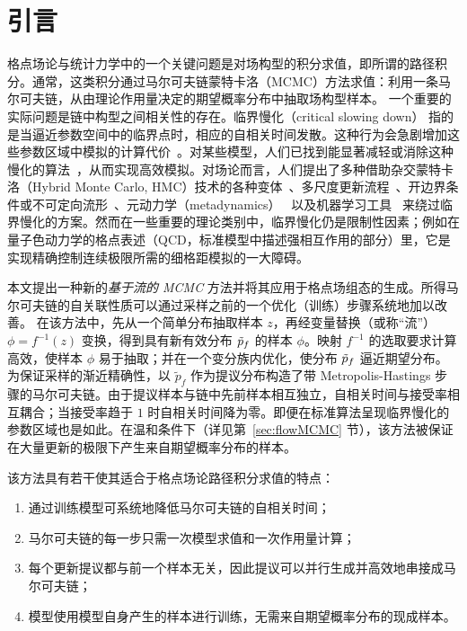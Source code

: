\section{引言}
\label{sec:intro}

%
格点场论与统计力学中的一个关键问题是对场构型的积分求值，即所谓的路径积分。通常，这类积分通过马尔可夫链蒙特卡洛（MCMC）方法求值：利用一条马尔可夫链，从由理论作用量决定的期望概率分布中抽取场构型样本。
%
一个重要的实际问题是链中构型之间相关性的存在。临界慢化（critical slowing down）\cite{Wolff:1989wq} 指的是当逼近参数空间中的临界点时，相应的自相关时间发散。这种行为会急剧增加这些参数区域中模拟的计算代价~\cite{DelDebbio:2004xh,Meyer:2006ty}。对某些模型，人们已找到能显著减轻或消除这种慢化的算法~\cite{Kandel:1988zz,Bonati:2017woi,PhysRevD.98.054502,SwendsenWang87,Wolff1989,ProkofevSvistunov01,KawashimaHarada04,Bietenholz1995MeronCluster}，从而实现高效模拟。对场论而言，人们提出了多种借助杂交蒙特卡洛（Hybrid Monte Carlo, HMC）技术的各种变体~\cite{Ramos:2012bb,Gambhir:2015rha,Cossu:2017eys,Jin2019QNHMC}、多尺度更新流程~\cite{Endres:2015yca,Detmold:2016rnh,Detmold:2018zgk}、开边界条件或不可定向流形~\cite{Luscher:2012av,Mages:2015scv,Burnier:2017osu}、元动力学（metadynamics）~\cite{Laio:2015era} 以及机器学习工具~\cite{Tanaka:2017niz,Shanahan:2018vcv} 来绕过临界慢化的方案。然而在一些重要的理论类别中，临界慢化仍是限制性因素；例如在量子色动力学的格点表述（QCD，标准模型中描述强相互作用的部分）里，它是实现精确控制连续极限所需的细格距模拟的一大障碍。

本文提出一种新的\emph{基于流的 MCMC} 方法并将其应用于格点场组态的生成。所得马尔可夫链的自关联性质可以通过采样之前的一个优化（训练）步骤系统地加以改善。
在该方法中，先从一个简单分布抽取样本 $z$，再经变量替换（或称``流''）$\phi = f^{-1}(z)$ 变换，得到具有新有效分布 $\tilde{p}_f$ 的样本 $\phi$。映射 $f^{-1}$ 的选取要求计算高效，使样本 $\phi$ 易于抽取；并在一个变分族内优化，使分布 $\tilde{p}_f$ 逼近期望分布。
为保证采样的渐近精确性，以 $\tilde{p}_{f}$ 作为提议分布构造了带 Metropolis-Hastings 步骤的马尔可夫链。由于提议样本与链中先前样本相互独立，自相关时间与接受率相互耦合；当接受率趋于 $1$ 时自相关时间降为零。即便在标准算法呈现临界慢化的参数区域也是如此。在温和条件下（详见第~\ref{sec:flowMCMC} 节），该方法被保证在大量更新的极限下产生来自期望概率分布的样本。

该方法具有若干使其适合于格点场论路径积分求值的特点：
%
\begin{enumerate}
    \item 通过训练模型可系统地降低马尔可夫链的自相关时间；
    \item
    马尔可夫链的每一步只需一次模型求值和一次作用量计算；
    \item 每个更新提议都与前一个样本无关，因此提议可以并行生成并高效地串接成马尔可夫链；
    \item 模型使用模型自身产生的样本进行训练，无需来自期望概率分布的现成样本。
\end{enumerate}

